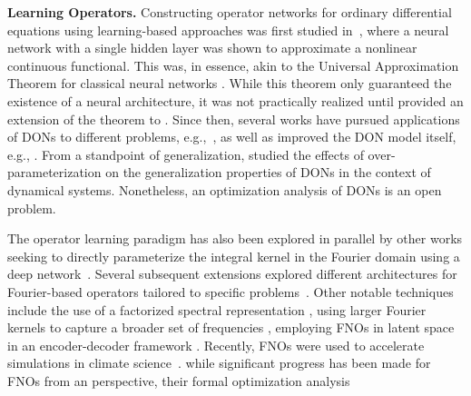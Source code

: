 
{\bf Learning Operators.}
Constructing operator networks for ordinary differential equations using learning-based approaches was first studied in~\citep{chen1995universal}, where a neural network with a single hidden layer was shown to approximate a nonlinear continuous functional.
This was, in essence, akin to the Universal Approximation Theorem for classical neural networks \citep{cybenkot_Univ_Approximation_1989,hornik_multilayer_1989,hornik1991approximation,lu_expressive_2017}. 
While this theorem only guaranteed the existence of a neural architecture, it was not practically realized until \cite{lu20201DeepONet} provided an extension of the theorem to . Since then, several works have pursued applications of DONs to different problems, e.g.,~\citep{goswami_physics-informed_2022,wang_long-time_2021,diab2024u,centofanti2024learning,sun2023deepgraphonet}, as well as improved the DON model itself, e.g., \cite{wang_learning_2021,qiu2024derivative}. 
From a standpoint of generalization, \citet{kontolati2022_Over_parameterization} studied the effects of over-parameterization on the generalization properties of DONs in the context of dynamical systems. Nonetheless, an optimization analysis of DONs is an open problem.

The operator learning paradigm has also been explored in parallel by other works seeking to directly parameterize the integral kernel in the Fourier domain using a deep network~\citep{bhattacharya_model_2021-1, bhattacharya_model_2021, li_fourier_2021, li_neural_2020, li_markov_2021}. Several subsequent extensions explored different architectures for Fourier-based operators tailored to specific problems~\citep{li_multipole_2020,liu_learning-based_2022,wen_u-fnoenhanced_2022,pathak_fourcastnet_2022,centofanti2024learning}. Other notable techniques include the use of a factorized spectral representation \cite{tran2021factorized}, using larger Fourier kernels to capture a broader set of frequencies \cite{qin2024toward}, employing FNOs in latent space in an encoder-decoder framework \cite{li2023fourier}. Recently, FNOs were used to accelerate simulations in climate science~\citep{yang2023fourier,harder2023hard}.  while significant progress has been made for FNOs from an  perspective,
their formal optimization analysis 

